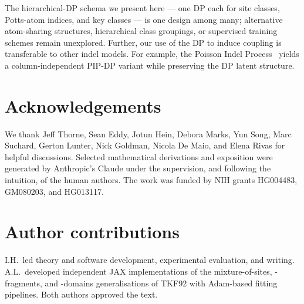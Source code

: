 \documentclass[11pt]{article}
\theoremstyle{definition}
\theoremstyle{remark}
\begin{document}
The hierarchical-DP schema we present here --- one DP each for site
classes, Potts-atom indices, and key classes --- is one design
among many; alternative atom-sharing structures, hierarchical
class groupings, or supervised training schemes remain unexplored.
Further, our use of the DP to induce coupling is transferable to other indel models.
For example, the Poisson Indel Process~\citep{bouchardcote2013} yields a
column-independent PIP-DP variant
while preserving the DP latent structure.







\section*{Acknowledgements}

We thank Jeff Thorne, Sean Eddy, Jotun Hein, Debora Marks, Yun Song, Marc Suchard, Gerton Lunter, Nick Goldman, Nicola De Maio, and Elena Rivas for helpful discussions.
Selected mathematical derivations and exposition were generated by Anthropic's Claude under the supervision, and following the intuition, of the human authors.
The work was funded by NIH grants HG004483, GM080203, and HG013117.

\section*{Author contributions}

I.H.\ led theory and software development, experimental evaluation, and writing.
A.L.\ developed independent JAX implementations of the mixture-of-sites, -fragments, and
-domains generalisations of TKF92 with Adam-based fitting pipelines.
Both authors approved the text.
\end{document}
